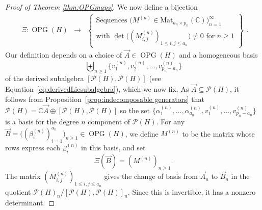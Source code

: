 \documentclass[11pt]{amsart}
\theoremstyle{definition}
\numberwithin{equation}{section}
\def\CC{{\mathbb C}}
\newcommand{\OPG}{\operatorname{OPG}}
\begin{document}
\begin{proof}[Proof of Theorem \ref{thm:OPGmaps}]
We now define a bijection
\[
\begin{array}{rcl}
\Xi: \OPG(H) &\to& \left\{ \begin{array}{c}
\text{Sequences $\big(M^{(n)} \in \mathrm{Mat}_{a_{n} \times p_{n}}(\CC)\big)_{n=1}^{\infty}$ } \\
\text{with $\det\big( (M^{(n)}_{i, j})_{1 \le i, j \le a_{n}} \big) \neq 0$ for $n \ge 1$}
\end{array}\right\}
\end{array}.
\]
Our definition depends on a choice of $\vec{A} \in \OPG(H)$ and a homogeneous basis 
\[
\biguplus_{n \geq 1}\{v_1^{(n)},v_2^{(n)},\ldots,v_{p_n - a_n}^{(n)}\}
\]
of the derived subalgebra $[\mathcal{P}(H),\mathcal{P}(H)]$  (see Equation~\eqref{eq:derivedLiesubalgebra}), which we now fix.  
As $\vec{A} \subseteq \mathcal{P}(H)$, it follows from Proposition~\ref{prop:indecomposable generators} that $\mathcal{P}(H) = \CC \vec{A} \oplus [\mathcal{P}(H), \mathcal{P}(H)]$ so the set $\{\alpha_{1}^{(n)}, \ldots, \alpha_{a_{n}}^{(n)}, v_{1}^{(n)}, \ldots, v_{p_n - a_n}^{(n)}\}$ is a basis for the degree $n$ component of $\mathcal{P}(H)$.  
For any $\vec{B} = \big((\beta_{i}^{(n)})_{i=1}^{a_{n}}\big)_{n \ge 1} \in \OPG(H)$, we define $M^{(n)}$ to be the matrix whose rows express each $\beta_{i}^{(n)}$ in this basis, and set
\[
\Xi(\vec{B}) = (M^{(n)})_{n \ge 1}.
\]
The matrix $(M^{(n)}_{i, j})_{1 \le i, j \le a_{n}}$ gives the change of basis from $\vec{A}_{n}$ to $\vec{B}_{n}$ in the quotient $\mathcal{P}(H)_{n}/[\mathcal{P}(H),\mathcal{P}(H)]_{n}$.  Since this is invertible, it has a nonzero determinant.


\end{proof}
\end{document}
